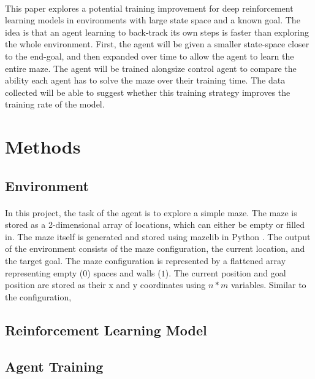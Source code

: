 \documentclass[12pt]{article}
\begin{document}

\paragraph{}
This paper explores a potential training improvement for deep reinforcement learning models in environments with large state space and a known goal.
The idea is that an agent learning to back-track its own steps is faster than exploring the whole environment.
First, the agent will be given a smaller state-space closer to the end-goal, and then expanded over time to allow the agent to learn the entire maze.
The agent will be trained alongsize control agent to compare the ability each agent has to solve the maze over their training time.
The data collected will be able to suggest whether this training strategy improves the training rate of the model.

\section{Methods}


\subsection{Environment}
\paragraph{}

In this project, the task of the agent is to explore a simple maze.
The maze is stored as a 2-dimensional array of locations, which can either be empty or filled in.
The maze itself is generated and stored using mazelib \cite{lib_mazelib} in Python \cite{lang_python}.
The output of the environment consists of the maze configuration, the current location, and the target goal.
The maze configuration is represented by a flattened array representing empty ($0$) spaces and walls ($1$).
The current position and goal position are stored as their x and y coordinates using $n * m$ variables.
Similar to the configuration, 


\subsection{Reinforcement Learning Model}

\subsection{Agent Training}
\end{document}
